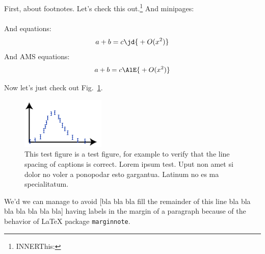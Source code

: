 \documentclass[10pt,a4paper,aps,reprint,notitlepage,nofootinbib]{revtex4-1}
\begin{document}
First, about footnotes. Let's check this out.\footnote{\ifinner INNER\fi This: }  And minipages:
\\
\\
And equations:
\begin{equation}
  a + b = c \text{\jd{\(\displaystyle{}+O(x^2)\)}}
\end{equation}
And AMS equations:
\begin{align}
  a + b = c \text{\AlE{\(\displaystyle{}+O(x^2)\)}}
\end{align}

Now let's just check out Fig.~\ref{fig:test}.
\begin{figure}
  \centering
  \includegraphics[width=4cm]{testfigure}
  \caption{This test figure is a test figure, for example to verify that the line spacing
    of captions is correct. Lorem ipsum test.  Uput non amet si dolor no voler a ponopodar
    esto gargantua.  Latinum no es ma specialitatum. }
  \label{fig:test}
\end{figure}

We'd   we can manage to avoid [bla bla bla fill the remainder of this line bla bla bla bla bla bla bla] having labels
 in the margin of a paragraph because of the behavior of LaTeX
package \texttt{marginnote}.





\end{document}
